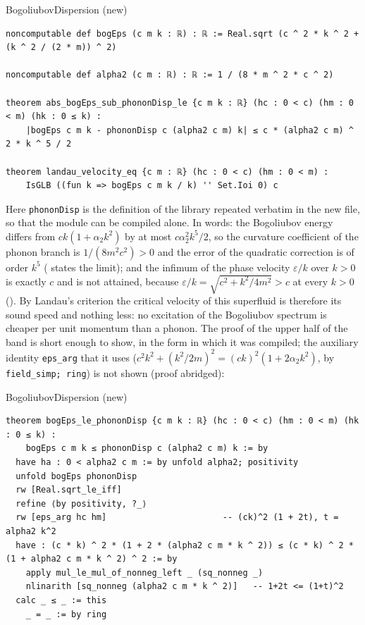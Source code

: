 \begin{leanbox}[title={Lean 4 \enspace BogoliubovDispersion (new for this book)}]{BogoliubovDispersion (new)}
\begin{lstlisting}[style=lean]
noncomputable def bogEps (c m k : ℝ) : ℝ := Real.sqrt (c ^ 2 * k ^ 2 + (k ^ 2 / (2 * m)) ^ 2)

noncomputable def alpha2 (c m : ℝ) : ℝ := 1 / (8 * m ^ 2 * c ^ 2)

theorem abs_bogEps_sub_phononDisp_le {c m k : ℝ} (hc : 0 < c) (hm : 0 < m) (hk : 0 ≤ k) :
    |bogEps c m k - phononDisp c (alpha2 c m) k| ≤ c * (alpha2 c m) ^ 2 * k ^ 5 / 2

theorem landau_velocity_eq {c m : ℝ} (hc : 0 < c) (hm : 0 < m) :
    IsGLB ((fun k => bogEps c m k / k) '' Set.Ioi 0) c
\end{lstlisting}
\end{leanbox}

\noindent Here \texttt{phononDisp} is the definition of the library repeated verbatim in the new file, so that the module can be compiled alone.
In words: the Bogoliubov energy differs from $ck(1+\alpha_2k^2)$ by at most $c\alpha_2^2k^5/2$, so the curvature coefficient of the phonon branch is $1/(8m^2c^2)>0$ and the error of the quadratic correction is of order $k^5$ ( states the limit); and the infimum of the phase velocity $\varepsilon/k$ over $k>0$ is exactly $c$ and is not attained, because $\varepsilon/k=\sqrt{c^2+k^2/4m^2}>c$ at every $k>0$ ().
By Landau's criterion the critical velocity of this superfluid is therefore its sound speed and nothing less: no excitation of the Bogoliubov spectrum is cheaper per unit momentum than a phonon.
The proof of the upper half of the band is short enough to show, in the form in which it was compiled; the auxiliary identity \texttt{eps\_arg} that it uses ($c^2k^2+(k^2/2m)^2=(ck)^2(1+2\alpha_2k^2)$, by \texttt{field\_simp; ring}) is not shown (proof abridged):

\begin{leanbox}[title={Lean 4 \enspace BogoliubovDispersion (new for this book)}]{BogoliubovDispersion (new)}
\begin{lstlisting}[style=lean]
theorem bogEps_le_phononDisp {c m k : ℝ} (hc : 0 < c) (hm : 0 < m) (hk : 0 ≤ k) :
    bogEps c m k ≤ phononDisp c (alpha2 c m) k := by
  have ha : 0 < alpha2 c m := by unfold alpha2; positivity
  unfold bogEps phononDisp
  rw [Real.sqrt_le_iff]
  refine ⟨by positivity, ?_⟩
  rw [eps_arg hc hm]                       -- (ck)^2 (1 + 2t), t = alpha2 k^2
  have : (c * k) ^ 2 * (1 + 2 * (alpha2 c m * k ^ 2)) ≤ (c * k) ^ 2 * (1 + alpha2 c m * k ^ 2) ^ 2 := by
    apply mul_le_mul_of_nonneg_left _ (sq_nonneg _)
    nlinarith [sq_nonneg (alpha2 c m * k ^ 2)]   -- 1+2t <= (1+t)^2
  calc _ ≤ _ := this
    _ = _ := by ring
\end{lstlisting}
\end{leanbox}

